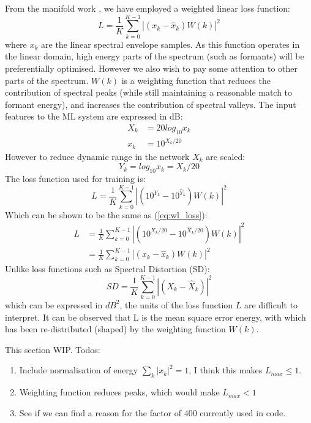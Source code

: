 \documentclass{article}
\begin{document}
From the manifold work \cite{rowe2023_manifold}, we have employed a weighted linear loss function:
\begin{equation}
\label{eq:wl_loss}
L = \frac{1}{K}\sum_{k=0}^{K-1}|(x_k-\hat{x}_k)W(k)|^2
\end{equation}
where $x_k$ are the linear spectral envelope samples. As this function operates in the linear domain, high energy parts of the spectrum (such as formants) will be preferentially optimised. However we also wish to pay some attention to other parts of the spectrum. $W(k)$ is a weighting function that reduces the contribution of spectral peaks (while still maintaining a reasonable match to formant energy), and increases the contribution of spectral valleys.
The input features to the ML system are expressed in dB:
\begin{equation}
\begin{split}
X_k &= 20log_{10}x_k \\
x_k &= 10^{X_k/20}
\end{split}
\end{equation}
However to reduce dynamic range in the network $X_k$ are scaled:
\begin{equation}
Y_k = log_{10}x_k = X_k/20
\end{equation}
The loss function used for training is:
\begin{equation}
L = \frac{1}{K}\sum_{k=0}^{K-1} | ( 10^{Y_k} - 10^{\hat{Y}_k} )W(k)|^2
\end{equation}
Which can be shown to be the same as (\ref{eq:wl_loss}):
\begin{equation}
\begin{split}
L &= \frac{1}{K}\sum_{k=0}^{K-1}|(10^{X_k/20} - 10^{\hat{X}_k/20})W(k)|^2 \\
  &= \frac{1}{K}\sum_{k=0}^{K-1}|(x_k - \hat{x}_k)W(k)|^2
\end{split}
\end{equation}
Unlike loss functions such as Spectral Distortion (SD):
\begin{equation}
\label{eq:sd_loss}
SD = \frac{1}{K}\sum_{k=0}^{K-1}|(X_k - \hat{X}_k)|^2
\end{equation}
which can be expressed in $dB^2$, the units of the loss function $L$ are difficult to interpret.  It can be observed that L is the mean square error energy, with which has been re-distributed (shaped) by the weighting function $W(k)$. 

This section WIP. Todos:
\begin{enumerate}
\item Include normalisation of energy $\sum_k |x_k|^2 = 1$, I think this makes $L_{max} \le 1$.
\item Weighting function reduces peaks, which would make $L_{max}<1$
\item See if we can find a reason for the factor of 400 currently used in code.
\end{enumerate}
\end{document}
